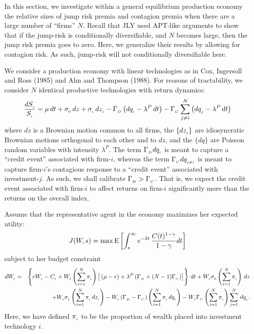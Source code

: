 \documentclass[titlepage,11pt]{article}
\def\big{\begin{array}{c} \\ \end{array} \!\!\!\!\!}
\def\bq{\begin{equation}}
\def\eq{\end{equation}}
\def\by{\begin{eqnarray}}
\def\ey{\end{eqnarray}}
\def\nn{\nonumber}
\begin{document}
In this section, we investigate within a general equilibrium production economy the
relative sizes of jump risk premia and contagion premia when there are a large number of
``firms'' $N$.  Recall that JLY used APT-like arguments to show that if the jump-risk is conditionally
diversifiable, and $N$ becomes large, then the jump risk premia goes to zero. Here, we
generalize their results by allowing for contagion risk.  As such, jump-risk will not
conditionally diversifiable here.

We consider a production economy with linear technologies as in Cox, Ingersoll and Ross (1985) and
Ahn and Thompson (1988).  For reasons of tractability, we consider $N$ identical productive technologies
with return dynamics:
\by
\frac{dS\sub{i}}{S\sub{i}}= \mu \, dt + \sigma\sub{0} \, dz  + \sigma\sub{i} \, dz\sub{i}
- \Gamma\sub{D} \left( dq\sub{i} - \lambda^{P} \, dt \right)
- \Gamma\sub{C} \sum_{j\neq i}^{N} \left( dq\sub{j} - \lambda^{P} \, dt \right)
\ey
where $dz$ is a Brownian motion common to all firms, the $\{dz_{_{{i}}}\}$ are idiosyncratic
Brownian motions orthogonal to each other and to $dz$, and
the $\{ dq \}$ are Poisson random variables with intensity $\lambda^{P}$.
The term $\Gamma_{_{{D}}} dq_{_{{i}}}$ is meant to capture a ``credit event'' associated with
firm-$i$, whereas the term $\Gamma_{_{{C}}} dq_{_{{j \neq i}}}$ is meant
to capture firm-$i$'s contagious response to a ``credit event'' associated with
investment-$j$.  As such, we shall calibrate $\Gamma_{_{{D}}} > \Gamma_{_{{C}}}$.  That is, we expect
the credit event associated with firm-$i$ to affect returns on firm-$i$ significantly more than
the returns on the overall index.


Assume that the representative agent in the economy maximizes her expected utility:
\bq
J(W,s) = \max\E\left[\int_s^\infty e^{-\delta t} \, \frac{C(t)^{1-\gamma}}{1-\gamma} dt\right]
\eq
subject to her budget constraint
\by
dW\sub{t} &=&
\left\{ rW\sub{t} - C\sub{t} + W\sub{t} \left( \sum_{i=1}^{N} \pi\sub{i} \right)
\left[ \big (\mu -r) + \lambda^{P} \left( \Gamma\sub{D} + (N-1) \Gamma\sub{C} \right) \right] \right\} \, dt
+ W\sub{t} \sigma\sub{0} \left( \sum_{i=1}^{N} \pi\sub{i} \right) \, dz \nn \\
%
&&
+ W\sub{t} \sigma\sub{1} \left( \sum_{i=1}^{N} \pi\sub{i} \, dz\sub{i} \right)
- W\sub{t} \left( \Gamma\sub{D} - \Gamma\sub{C} \right)  \left( \sum_{i=1}^{N} \pi\sub{i} \, dq\sub{i} \right)
- W\sub{t}  \Gamma\sub{C}  \left( \sum_{i=1}^{N} \pi\sub{i} \right) \sum_{j=1}^{N}\, dq\sub{j}.
\ey
Here, we have defined $\pi_{_{{i}}}$ to be the proportion of wealth placed into investment
technology $i$.
\end{document}
